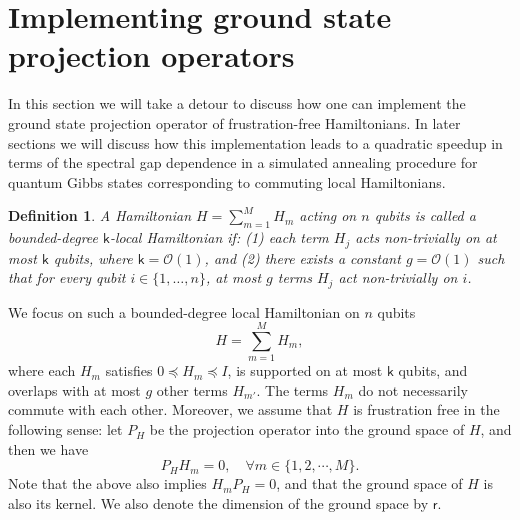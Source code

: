 \documentclass{article}
\theoremstyle{plain}
\theoremstyle{plain}
\theoremstyle{plain}
\theoremstyle{plain}
\theoremstyle{plain}
\theoremstyle{plain}
\theoremstyle{plain}
\newtheorem{defn}{Definition}
\begin{document}
\section{Implementing ground state projection operators}
\label{sec:implementing_ground_state_projection_operators}

In this section we will take a detour to discuss how one can implement the ground state projection operator of frustration-free Hamiltonians. In later sections we will discuss how this implementation leads to a quadratic speedup in terms of the spectral gap dependence in a simulated annealing procedure for quantum Gibbs states corresponding to commuting local Hamiltonians.

\begin{defn}
\label{defn:bounded_degree_local}
    A Hamiltonian $H = \sum_{m=1}^M H_m$
    acting on \(n\) qubits is called a \emph{bounded-degree $\mathsf{k}$-local Hamiltonian} if:
    (1) each term \(H_j\) acts non-trivially on at most $\mathsf{k}$ qubits, where \(\mathsf{k}=\mathcal{O}(1)\), and
    (2) there exists a constant \(g=\mathcal{O}(1)\) such that for every qubit \(i\in\{1,\dots,n\}\), at most \(g\) terms \(H_j\) act non-trivially on \(i\).
\end{defn}



We focus on such a bounded-degree local Hamiltonian on $n$ qubits 
\begin{equation}
    \label{eq:general_frsutration_free_ham}
    H = \sum_{m=1}^M H_m,
\end{equation}
where each $H_m$ satisfies $0\preceq H_m\preceq I$, is supported on at most $\mathsf{k}$ qubits, and overlaps with at most $g$ other terms $H_{m'}$. The terms $H_m$ do not necessarily commute with each other. Moreover, we assume that $H$ is frustration free in the following sense: let $P_H$ be the projection operator into the ground space of $H$, and then we have 
\begin{equation}
    \label{eq:frustration_free_ham}
    P_H H_m  = 0,\quad\forall m\in\{1,2,\cdots,M\}.
\end{equation}
Note that the above also implies $H_m P_H=0$, and that the ground space of $H$ is also its kernel. We also denote the dimension of the ground space by $\mathsf{r}$.
\end{document}
